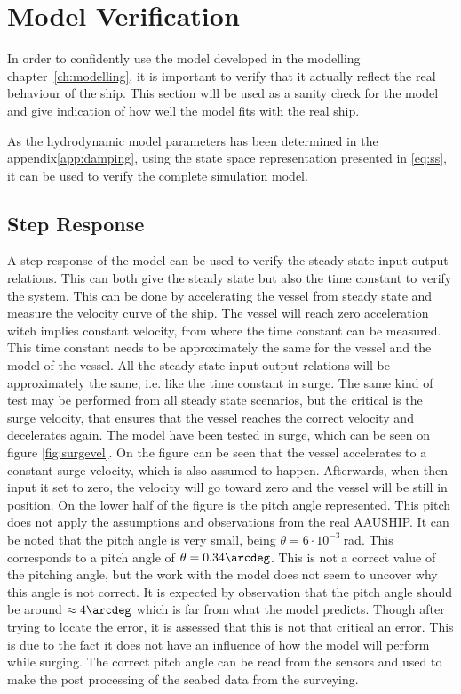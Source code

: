 \section{Model Verification}
\label{sec:model_verification}
In order to confidently use the model developed in the modelling chapter~\vref{ch:modelling}, it is important to verify that it actually reflect the real behaviour of the ship. This section will be used as a sanity check for the model and give indication of how well the model fits with the real ship.

As the hydrodynamic model parameters has been determined in the appendix\vref{app:damping}, using the state space representation presented in \vref{eq:ss}, it can be used to verify the complete simulation model.

\subsection{Step Response}
A step response of the model can be used to verify the steady state input-output relations. This can both give the steady state but also the time constant to verify the system. This can be done by accelerating the vessel from steady state and measure the velocity curve of the ship. The vessel will reach zero acceleration witch implies constant velocity, from where the time constant can be measured. This time constant needs to be approximately the same for the vessel and the model of the vessel. All the steady state input-output relations will be approximately the same, i.e. like the time constant in surge. The same kind of test may be performed from all steady state scenarios, but the critical is the surge velocity, that ensures that the vessel reaches the correct velocity and decelerates again. The model have been tested in surge, which can be seen on figure \ref{fig:surgevel}. On the figure can be seen that the vessel accelerates to a constant surge velocity, which is also assumed to happen. Afterwards, when then input it set to zero, the velocity will go toward zero and the vessel will be still in position. On the lower half of the figure is the pitch angle represented. This pitch does not apply the assumptions and observations from the real AAUSHIP. It can be noted that the pitch angle is very small, being $\theta = 6\cdot 10^{-3}\ $rad. This corresponds to a pitch angle of $\theta = 0.34\arcdeg$. This is not a correct value of the pitching angle, but the work with the model does not seem to uncover why this angle is not correct. It is expected by observation that the pitch angle should be around $\approx 4 \arcdeg$ which is far from what the model predicts. Though after trying to locate the error, it is assessed that this is not that critical an error. This is due to the fact it does not have an influence of how the model will perform while surging. The correct pitch angle can be read from the sensors and used to make the post processing of the seabed data from the surveying.
